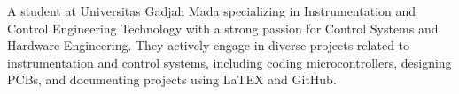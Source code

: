 

\begin{cvparagraph}

A student at Universitas Gadjah Mada specializing in Instrumentation and Control Engineering Technology with a strong passion for Control Systems and Hardware Engineering. They actively engage in diverse projects related to instrumentation and control systems, including coding microcontrollers, designing PCBs, and documenting projects using LaTEX and GitHub.
\end{cvparagraph}